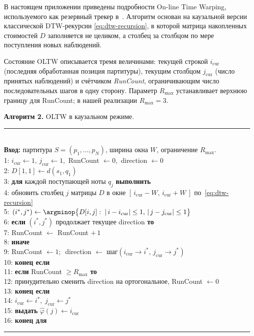 %
В настоящем приложении приведены подробности On-line Time Warping,
используемого как резервный трекер в~. Алгоритм
основан на каузальной версии классической DTW-рекурсии
\eqref{eq:dtw-recursion}, в которой матрица накопленных стоимостей
$D$ заполняется не целиком, а столбец за столбцом по мере поступления
новых наблюдений.

Состояние OLTW описывается тремя величинами: текущей строкой
$i_{\text{cur}}$ (последняя обработанная позиция партитуры), текущим
столбцом $j_{\text{cur}}$ (число принятых наблюдений) и счётчиком
\textit{RunCount}, ограничивающим число последовательных шагов в одну
сторону. Параметр $R_{\max}$ устанавливает верхнюю границу для
RunCount; в нашей реализации $R_{\max}=3$.

\par\addvspace{2pt}
{\centering
\begin{minipage}{0.97\linewidth}
\footnotesize
\textbf{Алгоритм 2.} OLTW в каузальном режиме. \\[1pt]
\rule{\linewidth}{0.4pt}\vspace{1pt}\\
\textbf{Вход:} партитура $S=(p_1,\dots,p_N)$, ширина окна $W$,
ограничение $R_{\max}$. \\
1: $i_{\text{cur}}\gets 1,\,j_{\text{cur}}\gets 1$,
   \,RunCount $\gets 0$, \,direction $\gets 0$ \\
2: $D[1,1]\gets d(s_1,q_1)$ \\
3: \textbf{для} каждой поступающей ноты $q_j$ \textbf{выполнить} \\
4: \quad обновить столбец $j$ матрицы $D$ в окне
   $[\,i_{\text{cur}}-W,\,i_{\text{cur}}+W\,]$
   по~\eqref{eq:dtw-recursion} \\
5: \quad $(i^*,j^*)\gets\argminop\bigl\{D[i,j]:
   \;|\,i-i_{\text{cur}}|\le 1,\,|\,j-j_{\text{cur}}|\le 1\bigr\}$ \\
6: \quad \textbf{если} $(i^*,j^*)$ продолжает текущее
   direction \textbf{то} \\
7: \quad\quad RunCount $\gets$ RunCount $+\,1$ \\
8: \quad \textbf{иначе} \\
9: \quad\quad RunCount $\gets 1$;\,\, direction $\gets$
   шаг$(i_{\text{cur}}\!\to\!i^*,\,j_{\text{cur}}\!\to\!j^*)$ \\
10: \quad \textbf{конец если} \\
11: \quad \textbf{если} RunCount $\ge R_{\max}$ \textbf{то} \\
12: \quad\quad принудительно сменить direction
   на ортогональное, RunCount $\gets 0$ \\
13: \quad \textbf{конец если} \\
14: \quad $i_{\text{cur}}\gets i^*,\;j_{\text{cur}}\gets j^*$ \\
15: \quad \textbf{выдать} $\hat\varphi(j)\gets i_{\text{cur}}$ \\
16: \textbf{конец для} \\
\rule{\linewidth}{0.4pt}
\end{minipage}\par}
\addvspace{4pt}

